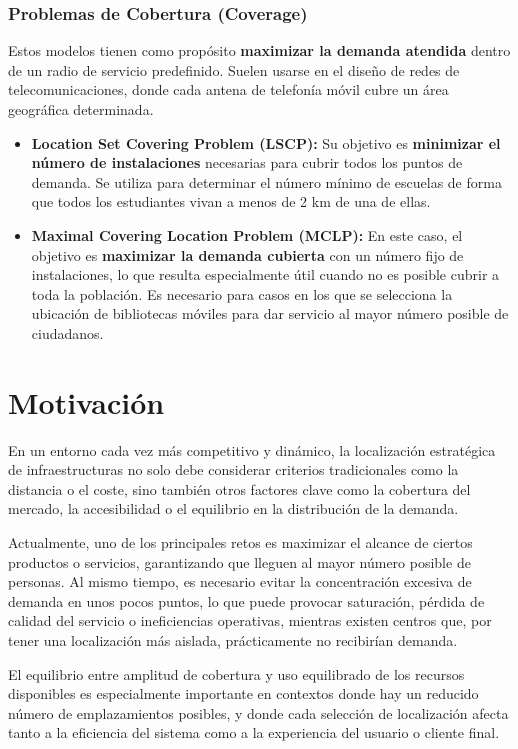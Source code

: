 \documentclass[12pt,a4paper]{book}
\begin{document}
\subsubsection{Problemas de Cobertura (Coverage)} 
Estos modelos tienen como propósito \textbf{maximizar la demanda atendida} dentro de un radio de servicio predefinido. 
Suelen usarse en el diseño de redes de telecomunicaciones, donde cada antena de telefonía móvil cubre un área geográfica determinada.

\begin{itemize}
    \item \textbf{Location Set Covering Problem (LSCP):}
    Su objetivo es \textbf{minimizar el número de instalaciones} necesarias para cubrir todos los puntos de demanda.
Se utiliza para determinar el número mínimo de escuelas de forma que todos los estudiantes vivan a menos de 2 km de una de ellas.

    \item \textbf{Maximal Covering Location Problem (MCLP):}
En este caso, el objetivo es \textbf{maximizar la demanda cubierta} con un número fijo de instalaciones, lo que resulta especialmente útil cuando no es posible cubrir a toda la población.
Es necesario para casos en los que se selecciona la ubicación de bibliotecas móviles para dar servicio al mayor número posible de ciudadanos.

\end{itemize}
\section{Motivación}

En un entorno cada vez más competitivo y dinámico, la localización estratégica de infraestructuras no solo debe considerar criterios tradicionales como la distancia o el coste, sino también otros factores clave como la cobertura del mercado, la accesibilidad o el equilibrio en la distribución de la demanda.

Actualmente, uno de los principales retos es maximizar el alcance de ciertos productos o servicios, garantizando que lleguen al mayor número posible de personas. Al mismo tiempo, es necesario evitar la concentración excesiva de demanda en unos pocos puntos, lo que puede provocar saturación, pérdida de calidad del servicio o ineficiencias operativas, mientras existen centros que, por tener una localización más aislada, prácticamente no recibirían demanda.

El equilibrio entre amplitud de cobertura y uso equilibrado de los recursos disponibles es especialmente importante en contextos donde hay un reducido número de emplazamientos posibles, y donde cada selección de localización afecta tanto a la eficiencia del sistema como a la experiencia del usuario o cliente final.
\end{document}
